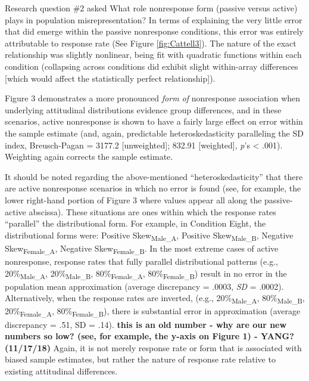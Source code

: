 \documentclass[
  man,mask]{apa7}
\begin{document}
Research question \#2 asked What role nonresponse form (passive versus active) plays in population misrepresentation? In terms of explaining the very little error that did emerge within the passive nonresponse conditions, this error was entirely attributable to response rate (See Figure \ref{fig:Cattell3}). The nature of the exact relationship was slightly nonlinear, being fit with quadratic functions within each condition (collapsing across conditions did exhibit slight within-array differences {[}which would affect the statistically perfect relationship{]}).

Figure 3 demonstrates a more pronounced \emph{form of} nonresponse association when underlying attitudinal distributions evidence group differences, and in these scenarios, active nonresponse is shown to have a fairly large effect on error within the sample estimate (and, again, predictable heteroskedasticity paralleling the SD index, Breusch-Pagan = 3177.2 {[}unweighted{]}; 832.91 {[}weighted{]}, \emph{p}'s \textless{} .001). Weighting again corrects the sample estimate.

It should be noted regarding the above-mentioned ``heteroskedasticity'' that there are active nonresponse scenarios in which no error is found (see, for example, the lower right-hand portion of Figure 3 where values appear all along the passive-active abscissa). These situations are ones within which the response rates ``parallel'' the distributional form. For example, in Condition Eight, the distributional forms were: Positive Skew\textsubscript{Male\_A}, Positive Skew\textsubscript{Male\_B}, Negative Skew\textsubscript{Female\_A}, Negative Skew\textsubscript{Female\_B}. In the most extreme cases of active nonresponse, response rates that fully parallel distributional patterns (e.g., 20\%\textsubscript{Male\_A}, 20\%\textsubscript{Male\_B}, 80\%\textsubscript{Female\_A}, 80\%\textsubscript{Female\_B}) result in no error in the population mean approximation (average discrepancy = .0003, \emph{SD} = .0002). Alternatively, when the response rates are inverted, (e.g., 20\%\textsubscript{Male\_A}, 80\%\textsubscript{Male\_B}, 20\%\textsubscript{Female\_A}, 80\%\textsubscript{Female\_B}), there is substantial error in approximation (average discrepancy = .51, SD = .14). \textbf{this is an old number - why are our new numbers so low? (see, for example, the y-axis on Figure 1) - YANG? (11/17/18)} Again, it is not merely response rate or form that is associated with biased sample estimates, but rather the nature of response rate relative to existing attitudinal differences.
\end{document}
